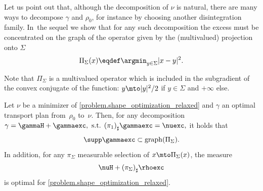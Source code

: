 Let us point out that, although the decomposition of $\nu$ is natural, there are many ways to decompose $\gamma$ and $\rho_0$, for instance by choosing another disintegration family. In~the sequel we show that for any such decomposition the excess must be concentrated on the graph of the operator given by the (multivalued) projection onto $\Sigma$
\begin{equation}\label{projection_operator}
\Pi_\Sigma(x) \eqdef \argmin_{y \in \Sigma} |x - y|^2.
\end{equation}

Note that $\Pi_\Sigma$ is a multivalued operator which is included in the subgradient of the convex conjugate of the function:
$y\mto |y|^2/2$ if $y\in \Sigma$ and $+\infty$ else.
\begin{lemma}\label{lemma.minimal_distance2Sigma}
Let $\nu$ be a minimizer of \eqref{problem.shape_optimization_relaxed} and $\gamma$ an optimal transport plan from~$\rho_0$ to~$\nu$. Then, for any decomposition
$
\gamma =
\gammaH+ \gammaexc,
\text{ s.t. }
{(\pi_{1})}_\sharp \gammaexc = \nuexc,
$
it holds that\vspace*{-3pt}
\begin{equation}
\supp \gammaexc \subset \mathrm{graph}(\Pi_\Sigma).\label{eqgammaexcproj}
\end{equation}
In addition, for any $\pi_\Sigma$ measurable selection of $x\mto \Pi_\Sigma(x)$, the measure\vspace*{-3pt}
\[
\nuH + {(\pi_{\Sigma})}_\sharp\rhoexc
\]
is optimal for \eqref{problem.shape_optimization_relaxed}.
\end{lemma}


